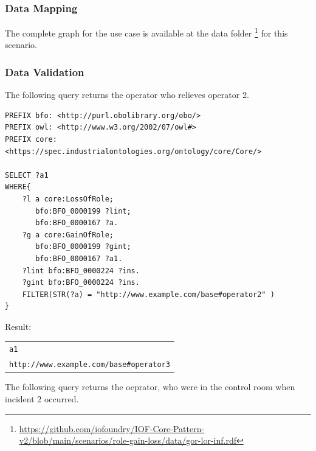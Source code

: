 \subsubsection*{Data Mapping}

The complete graph for the use case is available at the data folder \footnote{\url{https://github.com/iofoundry/IOF-Core-Pattern-v2/blob/main/scenarios/role-gain-loss/data/gor-lor-inf.rdf}} for this scenario. 

\subsubsection*{Data Validation}

The following query returns the operator who relieves operator 2.

\begin{verbatim}
PREFIX bfo: <http://purl.obolibrary.org/obo/>
PREFIX owl: <http://www.w3.org/2002/07/owl#>
PREFIX core: <https://spec.industrialontologies.org/ontology/core/Core/>

SELECT ?a1
WHERE{
	?l a core:LossOfRole;
       bfo:BFO_0000199 ?lint;
       bfo:BFO_0000167 ?a.
    ?g a core:GainOfRole;       
       bfo:BFO_0000199 ?gint;
       bfo:BFO_0000167 ?a1.
    ?lint bfo:BFO_0000224 ?ins.
    ?gint bfo:BFO_0000224 ?ins.
    FILTER(STR(?a) = "http://www.example.com/base#operator2" )
}
\end{verbatim}

Result:

\begin{table}[H]
    \begin{tabular}{l}
         \verb|a1| \\ \verb|http://www.example.com/base#operator3|   
    \end{tabular}
\end{table}


The following query returns the oeprator, who were in the control room when incident 2 occurred.

